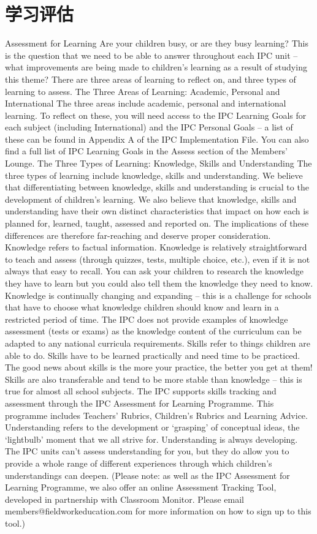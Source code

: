 \chapter{学习评估}

Assessment for Learning
Are your children busy, or are they busy learning? This is the question that we need to be able to answer throughout each IPC unit – what improvements are being made to children’s learning as a result of studying this theme?
There are three areas of learning to reflect on, and three types of learning to assess.
The Three Areas of Learning: Academic, Personal and International
The three areas include academic, personal and international learning. To reflect on these, you will need access to the IPC Learning Goals for each subject (including International) and the IPC Personal Goals – a list of these can be found in Appendix A of the IPC Implementation File. You can also find a full list of IPC Learning Goals in the Assess section of the Members’ Lounge.
The Three Types of Learning: Knowledge, Skills and Understanding
The three types of learning include knowledge, skills and understanding. We believe that differentiating between knowledge, skills and understanding is crucial to the development of children’s learning. We also believe that knowledge, skills and understanding have their own distinct characteristics that impact on how each is planned for, learned, taught, assessed and reported on. The implications of these differences are therefore far-reaching and deserve proper consideration.
Knowledge refers to factual information. Knowledge is relatively straightforward to teach and assess (through quizzes, tests, multiple choice, etc.), even if it is not always that easy to recall. You can ask your children to research the knowledge they have to learn but you could also tell them the knowledge they need to know. Knowledge is continually changing and expanding – this is a challenge for schools that have to choose what knowledge children should know and learn in a restricted period of time.
The IPC does not provide examples of knowledge assessment (tests or exams) as the knowledge content of the curriculum can be adapted to any national curricula requirements.
Skills refer to things children are able to do. Skills have to be learned practically and need time to be practiced. The good news about skills is the more your practice, the better you get at them! Skills are also transferable and tend to be more stable than knowledge – this is true for almost all school subjects.
The IPC supports skills tracking and assessment through the IPC Assessment for Learning Programme. This programme includes Teachers’ Rubrics, Children’s Rubrics and Learning Advice.
Understanding refers to the development or ‘grasping’ of conceptual ideas, the ‘lightbulb’ moment that we all strive for. Understanding is always developing.
The IPC units can’t assess understanding for you, but they do allow you to provide a whole range of different experiences through which children’s understandings can deepen.
(Please note: as well as the IPC Assessment for Learning Programme, we also offer an online Assessment Tracking Tool, developed in partnership with Classroom Monitor. Please email members@fieldworkeducation.com for more information on how to sign up to this tool.)
